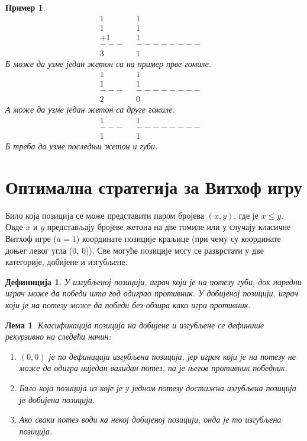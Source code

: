 \documentclass[a4paper]{article}
\newtheorem{example}{Пример}
\newtheorem{lemma}{Лема}
\newtheorem{definition}{Дефиниција}
\begin{document}
\begin{example}
		\begin{align*}
			1&		&		1&\\
			1&		&       1&\\
			+1&		&  	  	1&\\
			---&	&--------&\\
			3&		&       1
		\end{align*}
	\textit{Б} може да узме један жетон са на пример прве гомиле.
		\begin{align*}
			1&		&		1&\\
			1&		&  	  	1&\\
			---&	&--------&\\
			2&		&       0
		\end{align*}
	\textit{А} може да узме један жетон са друге гомиле.
		\begin{align*}
			1&		&  	  	1&\\
			---&	&--------&\\
			1&		&       1
		\end{align*}
	\textit{Б} треба да узме последњи жетон и губи.
\end{example}

\section{Оптимална стратегија за Витхоф игру}
\label{sec:optimalna_strategija_vithof}

Било која позиција се може представити паром бројева $ (x, y) $, где је $ x \le  y $. Овде  $ x $ и $ y $ представљају бројеве жетона на две гомиле или у случају класичне Витхоф игре ($ a = 1 $) координате позиције краљице (при чему су координате доњег левог угла (0, 0)). Све могуће позиције могу се разврстати у две категорије, добијене и изгубљене.

\begin{definition}
	У изгубљеној позицији, играч који је на потезу губи, док наредни играч може да победи шта год одиграо противник. У добијеној позицији, играч који је на потезу може да победи без обзира како игра противник.
\end{definition}

\begin{lemma}
	Класификација позиција на добијене и изгубљене се дефинише рекурзивно на следећи начин:
		\begin{enumerate}
			\item $ (0, 0) $ је по дефиницији изгубљена позиција, јер играч који је на потезу не може да одигра ниједан валидан потез, па је његов противник победник.
			\item Било која позиција из које је у једном потезу достижна изгубљена позиција је добијена позиција.
			\item Ако сваки потез води ка некој добијеној позицији, онда је то изгубљена позиција.
		\end{enumerate}	
\end{lemma}
\end{document}
